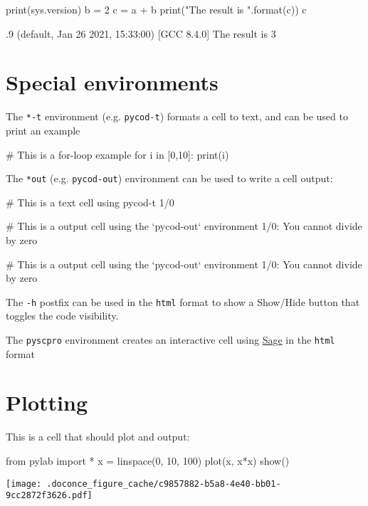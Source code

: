 \documentclass[%
oneside,                 %
final,                   %
chapterprefix=true,      %
open=right,              %
10pt]{book}
\begin{document}
\bpycod
print(sys.version)
b = 2
c = a + b
print("The result is {}".format(c))
c

\epycod

.9 (default, Jan 26 2021, 15:33:00) 
[GCC 8.4.0]
The result is 3
\epyout
{}\epyout

\section{Special environments}

The \texttt{*-t} environment (e.g. \texttt{pycod-t}) formats a cell to text, and can be used to print an example




\bpycod
# This is a for-loop example
for i in [0,10]:
  print(i)

\epycod


The \texttt{*out}  (e.g. \texttt{pycod-out}) environment can be used to write a cell output:



\bpycod
# This is a text cell using pycod-t
1/0

\epycod




\bpy
# This is a output cell using the `pycod-out` environment
1/0: You cannot divide by zero

\epy

\bpyout
# This is a output cell using the `pycod-out` environment
1/0: You cannot divide by zero
\epyout

The \texttt{-h} postfix can be used in the \texttt{html} format to show a Show/Hide button that toggles the code visibility. 

The \texttt{pyscpro} environment creates an interactive cell using \href{{https://github.com/sagemath/sagecell/}}{Sage} in the \texttt{html} format

\section{Plotting}

This is a cell that should plot and output:






\bpycod
from pylab import *
x = linspace(0, 10, 100)
plot(x, x*x)
show()

\epycod

\begin{center}
   \texttt{[image: .doconce\_figure\_cache/c9857882-b5a8-4e40-bb01-9cc2872f3626.pdf]}
\end{center}
\end{document}
